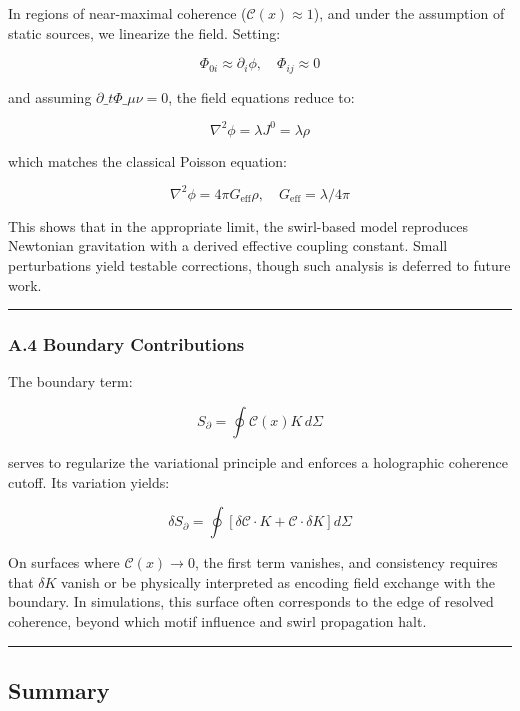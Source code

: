 \documentclass[
  11pt,
]{article}
\begin{document}
In regions of near-maximal coherence (\(\mathcal{C}(x) \approx 1\)), and
under the assumption of static sources, we linearize the field. Setting:

\[
\Phi_{0i} \approx \partial_i \phi, \quad \Phi_{ij} \approx 0
\]

and assuming \(\partial\_t \Phi\_{\mu\nu} = 0\), the field equations
reduce to:

\[
\nabla^2 \phi = \lambda J^0 = \lambda \rho
\]

which matches the classical Poisson equation:

\[
\nabla^2 \phi = 4\pi G_{\text{eff}} \rho, \quad G_{\text{eff}} = \lambda / 4\pi
\]

This shows that in the appropriate limit, the swirl-based model
reproduces Newtonian gravitation with a derived effective coupling
constant. Small perturbations yield testable corrections, though such
analysis is deferred to future work.

\begin{center}\rule{0.5\linewidth}{0.5pt}\end{center}

\subsubsection{A.4 Boundary
Contributions}\label{a.4-boundary-contributions}

The boundary term:

\[
S_\partial = \oint \mathcal{C}(x) K \, d\Sigma
\]

serves to regularize the variational principle and enforces a
holographic coherence cutoff. Its variation yields:

\[
\delta S_\partial = \oint \left[ \delta \mathcal{C} \cdot K + \mathcal{C} \cdot \delta K \right] d\Sigma
\]

On surfaces where \(\mathcal{C}(x) \to 0\), the first term vanishes, and
consistency requires that \(\delta K\) vanish or be physically
interpreted as encoding field exchange with the boundary. In
simulations, this surface often corresponds to the edge of resolved
coherence, beyond which motif influence and swirl propagation halt.

\begin{center}\rule{0.5\linewidth}{0.5pt}\end{center}

\subsection{Summary}\label{summary}
\end{document}
